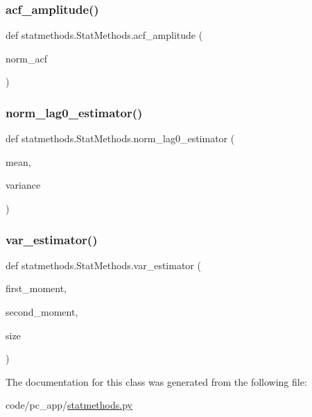 \subsubsection{\texorpdfstring{acf\+\_\+amplitude()}{acf\_amplitude()}}
{\footnotesize\ttfamily def statmethods.\+Stat\+Methods.\+acf\+\_\+amplitude (\begin{DoxyParamCaption}\item[{}]{norm\+\_\+acf }\end{DoxyParamCaption})}

\mbox{\label{classstatmethods_1_1StatMethods_a98bde45d59d8558c9b675b9f5dbd0922}} 
\subsubsection{\texorpdfstring{norm\+\_\+lag0\+\_\+estimator()}{norm\_lag0\_estimator()}}
{\footnotesize\ttfamily def statmethods.\+Stat\+Methods.\+norm\+\_\+lag0\+\_\+estimator (\begin{DoxyParamCaption}\item[{}]{mean,  }\item[{}]{variance }\end{DoxyParamCaption})}

\mbox{\label{classstatmethods_1_1StatMethods_ae9dd94cc0586ae5ea83ac6cf4a81cb69}} 
\subsubsection{\texorpdfstring{var\+\_\+estimator()}{var\_estimator()}}
{\footnotesize\ttfamily def statmethods.\+Stat\+Methods.\+var\+\_\+estimator (\begin{DoxyParamCaption}\item[{}]{first\+\_\+moment,  }\item[{}]{second\+\_\+moment,  }\item[{}]{size }\end{DoxyParamCaption})}



The documentation for this class was generated from the following file\+:\begin{DoxyCompactItemize}
\item 
code/pc\+\_\+app/\hyperlink{statmethods_8py}{statmethods.\+py}\end{DoxyCompactItemize}
